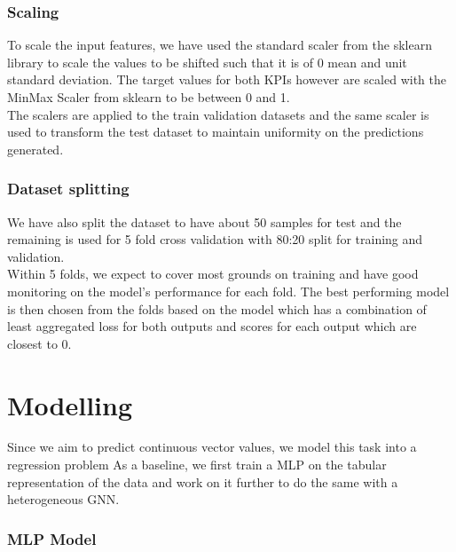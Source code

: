 \documentclass{report} %
\begin{document}
\subsection*{Scaling}

To scale the input features, we have used the standard scaler from the sklearn library to scale the values to be shifted such that it is of 0 mean and unit standard deviation.
The target values for both \ac{KPI}s however are scaled with the MinMax Scaler from sklearn to be between 0 and 1. \\
The scalers are applied to the train validation datasets and the same scaler is used to transform the test dataset to maintain uniformity on the predictions generated.

\subsection*{Dataset splitting}

We have also split the dataset to have about 50 samples for test and the remaining is used for 5 fold cross validation with 80:20 split for training and validation. \\
Within 5 folds, we expect to cover most grounds on training and have good monitoring on the model's performance for each fold.
The best performing model is then chosen from the folds based on the model which has a combination of least aggregated loss for both outputs and scores for each output which are closest to 0.

\newpage 

\chapter*{Modelling}

Since we aim to predict continuous vector values, we model this task into a regression problem
As a baseline, we first train a \ac{MLP} on the tabular representation of the data and work on it further to do the same with a heterogeneous \ac{GNN}.

\subsection*{\ac{MLP} Model}
\end{document}
